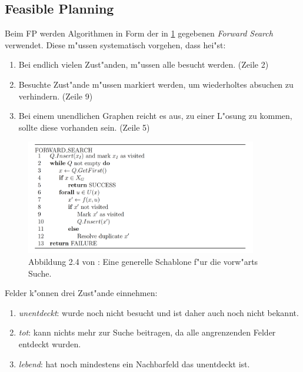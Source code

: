 \subsection {Feasible Planning} %
Beim FP werden Algorithmen in Form der in \ref{lav04} gegebenen \textit{Forward Search} verwendet. Diese m"ussen systematisch vorgehen, dass hei"st:
\begin{enumerate}
	\item Bei endlich vielen Zust"anden, m"ussen alle besucht werden. (Zeile 2)
	\item Besuchte Zust"ande m"ussen markiert werden, um wiederholtes absuchen zu verhindern. (Zeile 9)
	\item Bei einem unendlichen Graphen reicht es aus, zu einer L"osung zu kommen, sollte diese vorhanden sein. (Zeile 5)
\end{enumerate} \cite[~S. 32]{Lav06}
\begin{figure}
	\centering
	\includegraphics[width=0.9\textwidth]{images/img225.png}
	\caption{Abbildung 2.4 von \cite[~S. 33]{Lav06}:  Eine generelle Schablone f"ur die vorw"arts Suche.}
	\label{lav04}
\end{figure} 

Felder k"onnen drei Zust"ande einnehmen:
\begin{enumerate}

\item \textit{unentdeckt}: wurde noch nicht besucht und ist daher auch noch nicht bekannt.
\item \textit{tot}: kann nichts mehr zur Suche beitragen, da alle angrenzenden Felder entdeckt wurden.
\item \textit{lebend}: hat noch mindestens ein Nachbarfeld das unentdeckt ist.  
\end{enumerate} \cite[~S. 33]{Lav06}


